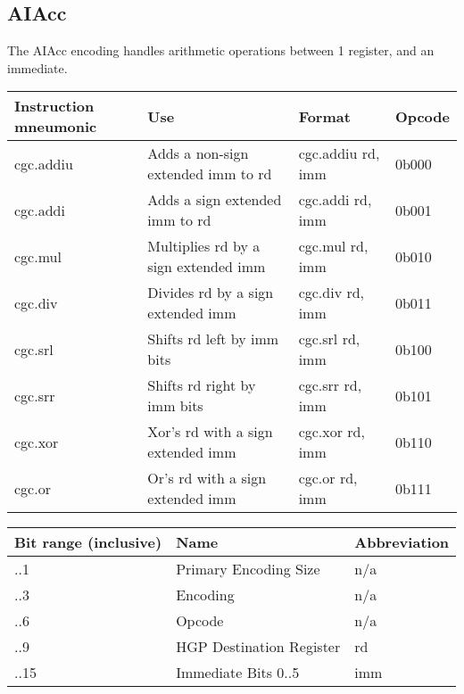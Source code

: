 \documentclass[6pt]{article}
\begin{document}
\subsection{AIAcc}
The AIAcc encoding handles arithmetic operations between 1 register, and an immediate.

\begin{center}
\begin{tabularx}{\textwidth}{ |>{\raggedright\arraybackslash}X|>{\raggedright\arraybackslash}X|>{\raggedright\arraybackslash}X|>{\raggedright\arraybackslash}X| }
    \hline
    Instruction mneumonic & Use & Format & Opcode \\
    \hline
    cgc.addiu & Adds a non-sign extended imm to rd & cgc.addiu rd, imm & 0b000 \\
    \hline
    cgc.addi & Adds a sign extended imm to rd & cgc.addi rd, imm & 0b001 \\
    \hline
    cgc.mul & Multiplies rd by a sign extended imm & cgc.mul rd, imm & 0b010 \\
    \hline
    cgc.div & Divides rd by a sign extended imm & cgc.div rd, imm & 0b011 \\
    \hline
    cgc.srl & Shifts rd left by imm bits & cgc.srl rd, imm & 0b100 \\
    \hline
    cgc.srr & Shifts rd right by imm bits & cgc.srr rd, imm & 0b101 \\
    \hline
    cgc.xor & Xor's rd with a sign extended imm & cgc.xor rd, imm & 0b110 \\
    \hline
    cgc.or & Or's rd with a sign extended imm & cgc.or rd, imm & 0b111 \\
    \hline
\end{tabularx}
\end{center}

\begin{center}
\begin{tabularx}{\textwidth}{ |>{\raggedright\arraybackslash}X|>{\raggedright\arraybackslash}X|>{\raggedright\arraybackslash}X| }
    \hline
    Bit range (inclusive) & Name & Abbreviation \\
    \hline
    0..1 & Primary Encoding Size & n/a \\
    \hline
    2..3 & Encoding & n/a \\
    \hline
    4..6 & Opcode & n/a \\
    \hline
    7..9 & HGP Destination Register & rd \\
    \hline
    10..15 & Immediate Bits 0..5 & imm \\
    \hline
\end{tabularx}
\end{center}
\end{document}
